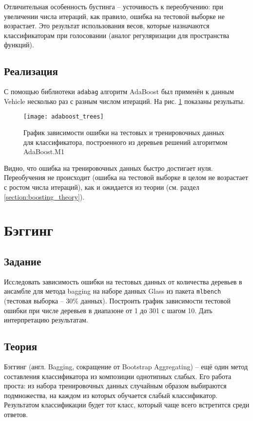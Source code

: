 \documentclass[a4paper,12pt]{article} %
\newcommand{\myPictWidth}{.95\textwidth}
\begin{document}
Отличительная особенность бустинга -- усточивость к переобучению: при увеличении числа итераций, как правило, ошибка на тестовой выборке не возрастает. Это результат использования весов, которые назначаются классификаторам при голосовании (аналог регуляризации для пространства функций). 

\subsection{Реализация}

С помощью библиотеки \texttt{adabag} алгоритм AdaBoost был применён к данным Vehicle несколько раз с разным числом итераций. На рис. \ref{fig:adaboost_trees} показаны резульаты. 

\begin{figure}[H]
	\centering \texttt{[image: adaboost\_trees]}
	\caption{График зависимости ошибки на тестовых и тренировочных данных для классификатора, построенного из деревьев решений алгоритмом AdaBoost.M1}
	\label{fig:adaboost_trees}
\end{figure}

Видно, что ошибка на тренировочных данных быстро достигает нуля.
Переобучения не происходит (ошибка на тестовой выборке в целом не возрастает с ростом числа итераций), как и ожидается из теории (см. раздел \ref{section:boosting_theory}).

\newpage
\section{Бэггинг}
\subsection{Задание}
Исследовать зависимость ошибки на тестовых данных от количества деревьев в ансамбле для метода bagging на наборе данных Glass из пакета \texttt{mlbench} (тестовая выборка -- 30\% данных). Построить график зависимости тестовой ошибки при числе деревьев в диапазоне от 1 до 301 с шагом 10. Дать интерпретацию результатам.


\subsection{Теория}
Бэггинг (англ. Bagging, сокращение от Bootstrap Aggregating) -- ещё один метод составления классификатора из композиции однотипных слабых. Его работа проста: из набора тренировочных данных случайным образом выбираются подмножества, на каждом из которых обучается слабый классификатор. Результатом классификации будет тот класс, который чаще всего встретится среди ответов.
\end{document}
